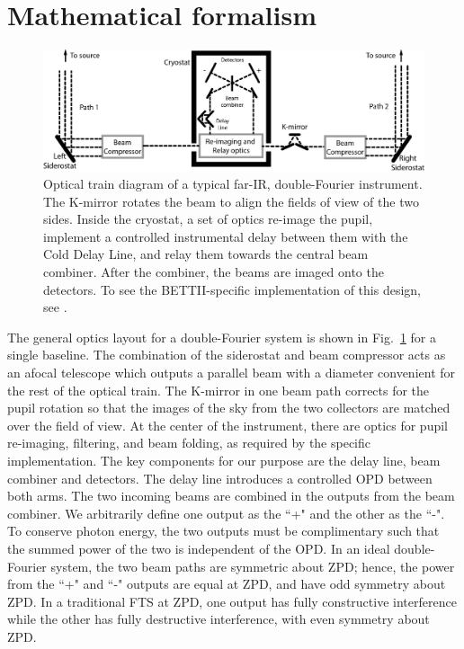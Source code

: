 \section{Mathematical formalism}
\label{sec:formalism}

\begin{figure}[ht!]
\begin{center}
\includegraphics[width=\textwidth]{Figures/f2.eps}
\caption[Optics layout of Double-Fourier interferometers]{Optical train diagram of a typical far-IR, double-Fourier instrument. The K-mirror rotates the beam to align the fields of view of the two sides. Inside the cryostat, a set of optics re-image the pupil, implement a controlled instrumental delay between them with the Cold Delay Line, and relay them towards the central beam combiner. After the combiner, the beams are imaged onto the detectors. To see the BETTII-specific implementation of this design, see \citet{Rinehart:2014gk}.}
\label{fig:optics}
\end{center}
\end{figure}

The general optics layout for a double-Fourier system is shown in Fig.~\ref{fig:optics} for a single baseline. 
The combination of the siderostat and beam compressor acts as an afocal telescope 
which outputs a  parallel beam with a diameter convenient for the rest of the optical train.
The K-mirror in one beam path corrects for the pupil rotation so that the
images of the sky from the two collectors are matched over the field of view.
At the center of the instrument, there are optics for pupil re-imaging, filtering, and beam folding, as required by the specific implementation.
The key components for our purpose are the delay line, beam combiner and detectors. 
The delay line introduces a controlled OPD between both arms.
The two incoming beams are combined in the outputs from the beam combiner. 
We arbitrarily define one output as the ``+" and the other as the \mbox{``-"}. 
To conserve photon energy, the two outputs must be complimentary such that the summed power of the two is
independent of the OPD. In an ideal double-Fourier system, the two beam paths are symmetric about ZPD; 
hence, the power 
from the ``+" and ``-" outputs are equal at ZPD, and have odd symmetry about ZPD. In a traditional FTS at ZPD, one output has fully constructive interference while the other has fully destructive interference, with even symmetry about ZPD.

